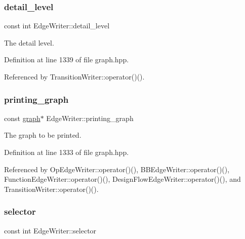 \subsubsection{\texorpdfstring{detail\+\_\+level}{detail\_level}}
{\footnotesize\ttfamily const int Edge\+Writer\+::detail\+\_\+level\hspace{0.3cm}{\ttfamily [protected]}}



The detail level. 



Definition at line 1339 of file graph.\+hpp.



Referenced by Transition\+Writer\+::operator()().

\mbox{\label{classEdgeWriter_a04cea5d80a335d20f8327b5cfb9a0dff}} 
\subsubsection{\texorpdfstring{printing\+\_\+graph}{printing\_graph}}
{\footnotesize\ttfamily const \hyperlink{structgraph}{graph}$\ast$ Edge\+Writer\+::printing\+\_\+graph\hspace{0.3cm}{\ttfamily [protected]}}



The graph to be printed. 



Definition at line 1333 of file graph.\+hpp.



Referenced by Op\+Edge\+Writer\+::operator()(), B\+B\+Edge\+Writer\+::operator()(), Function\+Edge\+Writer\+::operator()(), Design\+Flow\+Edge\+Writer\+::operator()(), and Transition\+Writer\+::operator()().

\mbox{\label{classEdgeWriter_a22c5d5b4e78561eba39818b30d2213e0}} 
\subsubsection{\texorpdfstring{selector}{selector}}
{\footnotesize\ttfamily const int Edge\+Writer\+::selector\hspace{0.3cm}{\ttfamily [protected]}}



